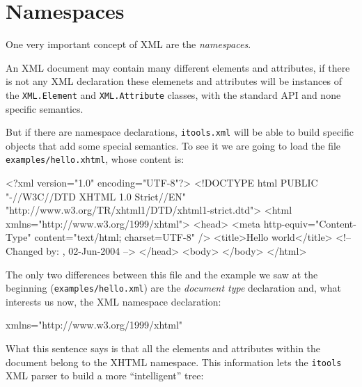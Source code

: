 \section{Namespaces}

One very important concept of XML are the {\em namespaces}.

An XML document may contain many different elements and attributes, if there
is not any XML declaration these elemenets and attributes will be instances
of the {\tt XML.Element} and {\tt XML.Attribute} classes, with the standard
API and none specific semantics.

But if there are namespace declarations, {\tt itools.xml} will be able to
build specific objects that add some special semantics. To see it we are
going to load the file {\tt examples/hello.xhtml}, whose content is:

\begin{code}
    <?xml version="1.0" encoding="UTF-8"?>
    <!DOCTYPE html PUBLIC "-//W3C//DTD XHTML 1.0 Strict//EN"
           "http://www.w3.org/TR/xhtml1/DTD/xhtml1-strict.dtd">
    <html xmlns="http://www.w3.org/1999/xhtml">
      <head>
        <meta http-equiv="Content-Type" content="text/html; charset=UTF-8" />
        <title>Hello world</title>
        <!-- Changed by: , 02-Jun-2004 -->
      </head>
      <body>
      </body>
    </html>
\end{code}

The only two differences between this file and the example we saw at the
beginning ({\tt examples/hello.xml}) are the {\em document type} declaration
and, what interests us now, the XML namespace declaration:

\begin{code}
    xmlns="http://www.w3.org/1999/xhtml"
\end{code}

What this sentence says is that all the elements and attributes within the
document belong to the XHTML namespace. This information lets the {\tt itools}
XML parser to build a more ``intelligent'' tree:

